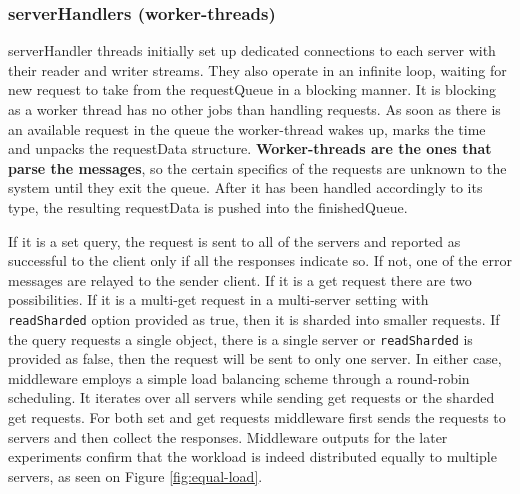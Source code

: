 \documentclass[11pt,a4paper]{article}
\begin{document}
\subsubsection{serverHandlers (worker-threads)} \label{sec:ov-workerthread}
serverHandler threads initially set up dedicated connections to each server with their reader and writer streams. They also operate in an infinite loop, waiting for new request to take from the requestQueue in a blocking manner. It is blocking as a worker thread has no other jobs than handling requests. As soon as there is an available request in the queue the worker-thread wakes up, marks the time and unpacks the requestData structure. \textbf{Worker-threads are the ones that parse the messages}, so the certain specifics of the requests are unknown to the system until they exit the queue. After it has been handled accordingly to its type, the resulting requestData is pushed into the finishedQueue.
\par
If it is a set query, the request is sent to all of the servers and reported as successful to the client only if all the responses indicate so. If not, one of the error messages are relayed to the sender client. If it is a get request there are two possibilities. If it is a multi-get request in a multi-server setting with \texttt{readSharded} option provided as true, then it is sharded into smaller requests. If the query requests a single object, there is a single server or \texttt{readSharded} is provided as false, then the request will be sent to only one server. In either case, middleware employs a simple load balancing scheme through a round-robin scheduling. It iterates over all servers while sending get requests or the sharded get requests. For both set and get requests middleware first sends the requests to servers and then collect the responses. Middleware outputs for the later experiments confirm that the workload is indeed distributed equally to multiple servers, as seen on Figure \ref{fig:equal-load}.
%
\end{document}
